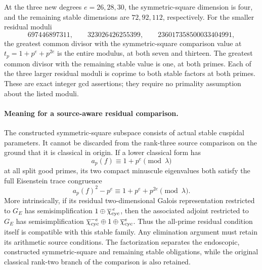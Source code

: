 At the three new degrees $e=26,28,30$, the symmetric-square
dimension is four, and the remaining stable dimensions are
$72,92,112$, respectively.  For the smaller residual moduli
\[
 697446897311,\qquad323026426255399,\qquad
 236017358500033404991,
\]
the greatest common divisor with the symmetric-square
comparison value at $t_p=1+p^e+p^{2e}$ is the entire modulus,
at both seven and thirteen.  The greatest common divisor with
the remaining stable value is one, at both primes.  Each of
the three larger residual moduli is coprime to both stable
factors at both primes.  These are exact integer gcd assertions;
they require no primality assumption about the listed moduli.

\paragraph{Meaning for a source-aware residual comparison.}
The constructed symmetric-square subspace consists of actual
stable cuspidal parameters.  It cannot be discarded from the
rank-three source comparison on the ground that it is classical
in origin.  If a lower classical form has
\[
               a_p(f)\equiv1+p^e\pmod\lambda
\]
at all split good primes, its two compact minuscule eigenvalues
both satisfy the full Eisenstein trace congruence
\[
       a_p(f)^2-p^e\equiv1+p^e+p^{2e}\pmod\lambda.
\]
More intrinsically, if its residual two-dimensional Galois
representation restricted to $G_E$ has semisimplification
$1\oplus\overline\chi_{\rm cyc}^{\,e}$, then the associated
adjoint restricted to $G_E$ has semisimplification
$\overline\chi_{\rm cyc}^{-e}\oplus1\oplus
 \overline\chi_{\rm cyc}^{e}$.
Thus the all-prime residual condition itself is compatible
with this stable family.  Any elimination argument must
retain its arithmetic source conditions.  The factorization
separates the endoscopic, constructed symmetric-square and
remaining stable obligations, while the original classical
rank-two branch of the comparison is also retained.

